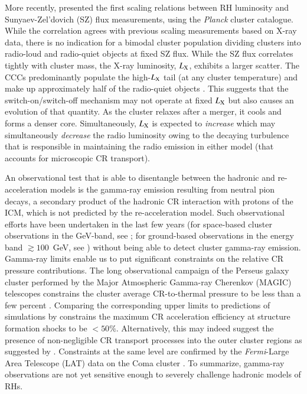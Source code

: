\documentclass[useAMS,usenatbib]{mn2e}
\begin{document}
More recently, \cite{2012MNRAS.421L.112B} presented the first scaling relations
between RH luminosity and Sunyaev-Zel'dovich (SZ) flux measurements, using the
\emph{Planck} cluster catalogue. While the correlation agrees with previous
scaling measurements based on X-ray data, there is no indication for a bimodal
cluster population dividing clusters into radio-loud and radio-quiet objects at
fixed SZ flux. While the SZ flux correlates tightly with cluster mass, the X-ray
luminosity, $L_{\mathrm{X}}$, exhibits a larger scatter. The CCCs predominantly
populate the high-$L_{\mathrm{X}}$ tail (at any cluster temperature) and make up
approximately half of the radio-quiet objects \citep{2011A&A...527A..99E}. This
suggests that the switch-on/switch-off mechanism may not operate at fixed
$L_{\mathrm{X}}$ but also causes an evolution of that quantity. As the cluster
relaxes after a merger, it cools and forms a denser core. Simultaneously,
$L_{\mathrm{X}}$ is expected to {\em increase} which may simultaneously {\em
  decrease} the radio luminosity owing to the decaying turbulence that is
responsible in maintaining the radio emission in either model (that accounts for
microscopic CR transport).
 
An observational test that is able to disentangle between the hadronic and
re-acceleration models is the gamma-ray emission resulting from neutral pion
decays, a secondary product of the hadronic CR interaction with protons of the
ICM, which is not predicted by the re-acceleration model. Such observational
efforts have been undertaken in the last few years (for space-based cluster
observations in the GeV-band, see \citealt{2003ApJ...588..155R,
  2010JCAP...05..025A,2010ApJ...717L..71A,2012AAS...21920701Z}; for ground-based
observations in the energy band $\gtrsim100$~GeV, see
\citealt{2006ApJ...644..148P, 2008AIPC.1085..569P,
  2009arXiv0907.0727T,2009A&A...495...27A, 2009arXiv0907.3001D,
  2009arXiv0907.5000G, cangaroo_clusters, 2009ApJ...706L.275A,
  2010ApJ...710..634A, 2011arXiv1111.5544M,2012...VERITAS,2012A&A...545A.103H})
without being able to detect cluster gamma-ray emission.  Gamma-ray limits
enable us to put significant constraints on the relative CR pressure
contributions. The long observational campaign of the Perseus galaxy cluster
performed by the Major Atmospheric Gamma-ray Cherenkov (MAGIC) telescopes
constrains the cluster average CR-to-thermal pressure to be less than a few
percent \citep{2010ApJ...710..634A,2011arXiv1111.5544M}. Comparing the
corresponding upper limits to predictions of simulations by
\cite{2010MNRAS.409..449P} constrains the maximum CR acceleration efficiency at
structure formation shocks to be $<50\%$.  Alternatively, this may indeed
suggest the presence of non-negligible CR transport processes into the outer
cluster regions as suggested by \cite{2011A&A...527A..99E}.  Constraints at the
same level are confirmed by the \emph{Fermi}-Large Area Telescope (LAT) data on
the Coma cluster \citep{2011arXiv1105.3240P,2012AAS...21920701Z,
  2012...VERITAS}. To summarize, gamma-ray observations are not yet sensitive
enough to severely challenge hadronic models of RHs.
\end{document}
